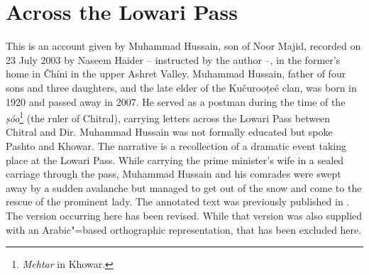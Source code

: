 \appendix
{}

\section*{Across the Lowari Pass}

This is an account given by Muhammad Hussain, son of Noor Majid, recorded on 23 July 2003 by Naseem Haider -- instructed by the author --, in the former’s home in Čhíni in the upper Ashret Valley. Muhammad Hussain, father of four sons and three daughters, and the late elder of the Kučurooṭeé clan, was born in 1920 and passed away in 2007. He served as a postman during the time of the \textit{ṣóo}\footnote{\textit{Mehtar} in Khowar.} (the ruler of Chitral), carrying letters across the Lowari Pass between Chitral and Dir. Muhammad Hussain was not formally educated but spoke Pashto and Khowar. The narrative is a recollection of a dramatic event taking place at the Lowari Pass. While carrying the prime minister’s wife in a sealed carriage through the pass, Muhammad Hussain and his comrades were swept away by a sudden avalanche but managed to get out of the snow and come to the rescue of the prominent lady. The annotated text was previously published in \citet[131--137]{liljegrenhaider2015}. The version occurring here has been revised. While that version was also supplied with an Arabic"=based orthographic representation, that has been excluded here.


